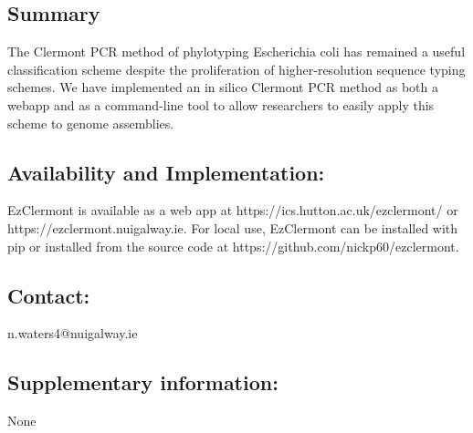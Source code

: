 \subsection{Summary}
The Clermont PCR method of phylotyping Escherichia coli has remained a useful classification scheme despite the proliferation of higher-resolution sequence typing schemes.  We have implemented an in silico Clermont PCR method as both a webapp and as a command-line tool to allow researchers to easily apply this scheme to genome assemblies.
\subsection{Availability and Implementation:}
EzClermont is available as a web app at  https://ics.hutton.ac.uk/ezclermont/ or https://ezclermont.nuigalway.ie.  For local use, EzClermont can be installed with pip or installed from the source code at https://github.com/nickp60/ezclermont.
\subsection{Contact: }
n.waters4@nuigalway.ie
\subsection{Supplementary information: }
None
